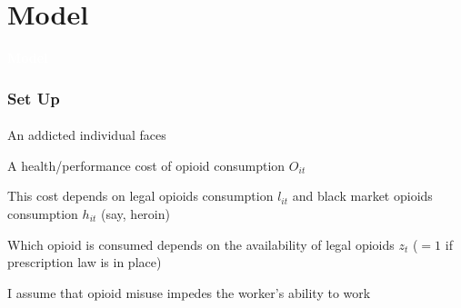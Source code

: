 \section{Model}

\begin{transitionframe}

    \rmfamily %
    
    \begin{center}
    {\Huge \textbf{\textcolor{white}{Model}}}
    \end{center}
  
\end{transitionframe}

\begin{frame}

    \frametitle{Set Up} %
    \framesubtitle{}  %
    \rmfamily %

    An addicted individual faces
    \vspace{9pt}
    \begin{wideitemize}
        \item A health/performance \textcolor{fblu}{cost of opioid consumption} \(O_{it}\)
        \item This cost depends on \textcolor{fblu}{legal opioids consumption} \(l_{it}\) and \textcolor{fblu}{black market opioids consumption} \(h_{it}\) (say, heroin)
        \item Which opioid is consumed depends on the \textcolor{fblu}{availability of legal opioids} \(z_{t}\) (\(= 1\) if prescription law is in place)
        \item I assume that opioid misuse impedes the worker's ability to work
    \end{wideitemize}

\end{frame}

